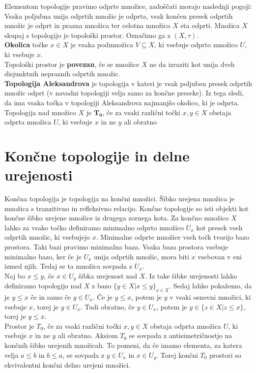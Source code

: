 \documentclass[a4paper, 12pt]{book}
\theoremstyle{definition}
\begin{document}
Elementom topologije pravimo odprte množice, zadoščati morajo naslednji pogoji:
Vsaka poljubna unija odprtih množic je odprta, vsak končen presek odprtih množic je odprt
in prazna množica ter celotna množica $X$ sta odprti. Množica $X$ skupaj s topologijo
je topološki prostor. Označimo ga z $(X,\tau)$.\\
\textbf{Okolica} točke $x \in X$ je vsaka podmnožica $V \subseteq X$, ki vsebuje
odprto množico $U$, ki vsebuje $x$.\\
Topološki prostor je \textbf{povezan}, če se množice $X$ ne da izraziti kot unija
dveh disjunktnih nepraznih odprtih množic.\\
\textbf{Topologija Aleksandrova} je topologija v kateri je vsak poljuben presek odprtih
množic odprt (v navadni topologiji velja samo za končne preseke). Iz tega sledi,
da ima vsaka točka v topologiji Aleksandrova najmanjšo okolico, ki je odprta.\\
Topologija nad množico $X$ je $\mathbf{T_0}$, če za vsaki različni točki $x,y \in X$
obstaja odprta množica $U$, ki vsebuje $x$ in ne $y$ ali obratno

\chapter{Končne topologije in delne urejenosti}
Končna topologija je topologija na končni množici. Šibko urejena množica je
množica s tranzitivno in refleksivno relacijo. Končne topologije so isti objekti
kot končne šibko urejene množice iz drugega zornega kota. Za končno množico $X$ lahko
za vsako točko definiramo minimalno odprto množico $U_x$ kot presek vseh odprtih
množic, ki vsebujejo $x$. Minimalne odprte množice vseh točk tvorijo bazo prostora.
Taki bazi pravimo minimalna baza. Vsaka baza prostora vsebuje minimalno bazo,
ker če je $U_x$ unija odprtih množic, mora biti $x$ vsebovan v eni izmed njih.
Tedaj se ta množica sovpada z $U_x$.\\
Naj bo $x \leq y$, če $x \in U_y$ šibka urejenost nad $X$. Iz take šibke urejenosti
lahko definiramo topologijo nad $X$ z bazo $\{y \in X | x \leq y\}_{x \in X}$.
Sedaj lahko pokažemo, da je $y \leq x$ če in samo če $y \in U_x$.
Če je $y \leq x$, potem je $y$ v vsaki osnovni množici, ki vsebuje $x$, torej je $y \in U_x$.
Tudi obratno, če $y \in U_x$, potem je $y \in \{z \in X | z \leq x\}$, torej  je $y \leq x$.\\
Prostor je $T_0$, če za vsaki različni točki $x,y \in X$ obstaja odprta množica
$U$, ki vsebuje $x$ in ne $y$ ali obratno. Aksiom $T_0$ se sovpada z antisimetričnostjo na
končnih šibko urejenih množicah. To pomeni, da če imamo elementa, za katera velja
$a \leq b$ in $b \leq a$, se sovpada z $y \in U_x$ in $x \in U_y$. Torej končni $T_0$ prostori so ekvivalentni
končni delno urejeni množici.\\
\end{document}
